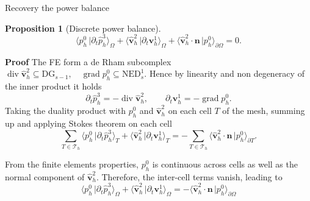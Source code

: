 \documentclass[aspectratio=169]{beamer}
\DeclareMathOperator*{\grad}{grad}
\renewcommand{\div}{\operatorname{div}}
\newcommand{\dualpr}[3][]{\ensuremath{\langle #2 \, \vert #3 \rangle_{#1}}}
\newcommand*{\dual}[1]{\ensuremath{\widehat{#1}}}
\newtheorem{proposition}{Proposition}
\begin{document}
	\begin{frame}{Recovery the power balance}
		
		\begin{proposition}[Discrete power balance]
			\begin{equation*}
				\dualpr[\Omega]{p^{0}_h}{\partial_t \dual{p}^3_h} + \dualpr[\Omega]{\dual{\bm{v}}^{2}_h}{\partial_t \bm{v}^{1}_h} + \dualpr[\partial \Omega]{\dual{\bm{v}}^2_h \cdot \bm{n}}{p_{h}^{0}} = 0.
			\end{equation*}
		\end{proposition}
		\textbf{Proof} The FE form a de Rham subcomplex $\div \dual{\bm{v}}^2_h \subseteq \mathrm{DG}_{s-1}, \quad \grad p_h^0 \subseteq \mathrm{NED}_s^1$. Hence by linearity and non degeneracy of the inner product it holds
		\begin{equation*}
			\partial_t \dual{p}_h^3 = -\div \dual{\bm{v}}^2_h, \qquad \partial_t \bm{v}_h^1 = -\grad p_h^0.
		\end{equation*}
		Taking the duality product with $p_h^0$ and $\dual{\bm{v}}_h^2$ on each cell $T$ of the mesh, summing up and applying Stokes theorem on each cell
		\begin{equation*}
			\sum_{T \in \mathcal{T}_h} \dualpr[T]{p_h^0}{\partial_t \dual{p}_h^3} + \dualpr[T]{\dual{\bm{v}}^{2}_h}{\partial_t \bm{v}^{1}_h} = -\sum_{T \in \mathcal{T}_h} \dualpr[\partial T]{\dual{\bm{v}}^2_h \cdot \bm{n}}{p_h^0}.
		\end{equation*}
		
		From the finite elements properties, $p_h^0$ is continuous across cells as well as the normal component of $\dual{\bm{v}}^{2}_h$. Therefore, the inter-cell terms vanish, leading to
		\begin{equation*}
			\dualpr[\Omega]{p_h^0}{\partial_t \dual{p}_h^3} + \dualpr[\Omega]{\dual{\bm{v}}^{2}_h}{\partial_t \bm{v}^{1}_h}  = - \dualpr[\partial \Omega]{\dual{\bm{v}}^2_h \cdot \bm{n}}{p_h^0}
		\end{equation*}
		
	\end{frame}
	
\end{document}
